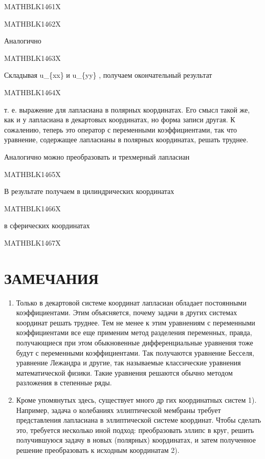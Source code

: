 \documentclass[
]{article}
\begin{document}
MATHBLK1461X

MATHBLK1462X

Аналогично

MATHBLK1463X

Складывая u\_\{xx\} и u\_\{yy\} , получаем окончательный результат

MATHBLK1464X

т. е. выражение для лапласиана в полярных координатах. Его смысл такой
же, как и у лапласиана в декартовых координатах, но форма записи другая.
К сожалению, теперь это оператор с переменными коэффициентами, так что
уравнение, содержащее лапласианы в полярных координатах, решать труднее.

Аналогично можно преобразовать и трехмерный лапласиан

MATHBLK1465X

В результате получаем в цилиндрических координатах

MATHBLK1466X

в сферических координатах

MATHBLK1467X

\section{ЗАМЕЧАНИЯ}\label{ux437ux430ux43cux435ux447ux430ux43dux438ux44f-3}

\begin{enumerate}
\def\labelenumi{\arabic{enumi}.}
\item
  Только в декартовой системе координат лапласиан обладает постоянными
  коэффициентами. Этим объясняется, почему задачи в других системах
  координат решать труднее. Тем не менее к этим уравнениям с переменными
  коэффициентами все еще применим метод разделения переменных, правда,
  получающиеся при этом обыкновенные дифференциальные уравнения тоже
  будут с переменными коэффициентами. Так получаются уравнение Бесселя,
  уравнение Лежандра и другие, так называемые классические уравнения
  математической физики. Такие уравнения решаются обычно методом
  разложения в степенные ряды.
\item
  Кроме упомянутых здесь, существует много др гих координатных систем
  1). Например, задача о колебаниях эллиптической мембраны требует
  представления лапласиана в эллиптической системе координат. Чтобы
  сделать это, требуется несколько иной подход: преобразовать эллипс в
  круг, решить получившуюся задачу в новых (полярных) координатах, и
  затем полученное решение преобразовать к исходным координатам 2).
\end{enumerate}
\end{document}
